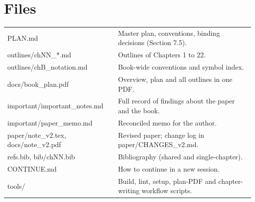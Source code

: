 \documentclass[11pt]{article}
\begin{document}
\appendix
\section{Files}
{\small
\begin{xltabular}{\linewidth}{>{\ttfamily}p{5.2cm}L}
\toprule
PLAN.md & Master plan, conventions, binding decisions (Section 7.5).\\
outlines/chNN\_*.md & Outlines of Chapters 1 to 22.\\
outlines/chB\_notation.md & Book-wide conventions and symbol index.\\
docs/book\_plan.pdf & Overview, plan and all outlines in one PDF.\\
important/important\_notes.md & Full record of findings about the paper and the book.\\
important/paper\_memo.md & Reconciled memo for the author.\\
paper/note\_v2.tex, docs/note\_v2.pdf & Revised paper; change log in paper/CHANGES\_v2.md.\\
refs.bib, bib/chNN.bib & Bibliography (shared and single-chapter).\\
CONTINUE.md & How to continue in a new session.\\
tools/ & Build, lint, setup, plan-PDF and chapter-writing workflow scripts.\\
\bottomrule
\end{xltabular}
}
\end{document}
